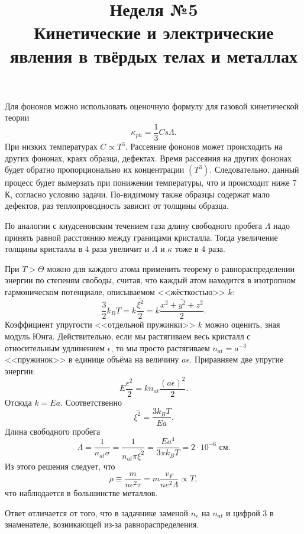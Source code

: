 \documentclass[a4paper]{article}
\title{Неделя №5\\
Кинетические и электрические явления
в твёрдых телах и металлах}
\begin{document}
	\maketitle
\begin{hiProb}[2.65]
\end{hiProb}
\begin{sol}
Для фононов можно использовать оценочную формулу
для газовой кинетической теории 
\[
\kappa_{ph}= \frac{1}{3} C s\Lambda
.\] 
При низких температурах $C \propto T^3$.
Рассеяние фононов может происходить на других
фононах, краях образца, дефектах. Время
рассеяния на других фононах будет обратно
пропорционально их концентрации $(T^3)$. Следовательно,
данный процесс будет вымерзать при понижении температуры, что и происходит ниже 7 К, согласно условию
задачи. По-видимому также образцы содержат мало
дефектов, раз теплопроводность зависит от толщины
образца.

По аналогии с кнудсеновским течением газа длину
свободного пробега  $\Lambda$ надо принять
равной расстоянию между границами кристалла. Тогда
увеличение толщины кристалла в 4 раза увеличит
и $ \Lambda$ и $\kappa$ тоже в 4 раза.
\end{sol}
\begin{hiProb}[3.77]
\end{hiProb}
\begin{sol}
При $T > \Theta$ можно для каждого атома
применить теорему о равнораспределении энергии
по степеням свободы, считая, что каждый атом находится
в изотропном гармоническом потенциале, описываемом
<<жёсткостью>> $k$:
\[
\frac{3}{2} k_B T= k \frac{\overline{\xi^2}}{2}=
k \frac{\overline{x^2 +y^2+z^2}}{2}
.\] 
Коэффициент упругости <<отдельной пружинки>>
$k$ можно оценить, зная модуль Юнга. Действительно,
если мы растягиваем весь кристалл с относительным
удлинением $\epsilon $, то мы  просто растягиваем
$n_{at}=a^{-3}$ <<пружинок>> в единице объёма
на величину $a\epsilon $. Приравняем две
упругие энергии:
\[
	E \frac{\epsilon ^2}{2}=k n_{at} \frac{(a\epsilon )^2}{2}
.\] 
Отсюда $k=Ea$. Соответственно 
\[
\overline{\xi^2}= \frac{3k_B T}{Ea}
.\] 
Длина свободного пробега
\[
\Lambda = \frac{1}{n_{at}\sigma}= \frac{1}{n_{at}\pi
\overline{\xi^2}}= \frac{Ea^4}{3\pi k_B T}= 2\cdot 
10^{-6} \text{ см}
.\] 
Из этого решения следует, что
 \[
\rho\equiv \frac{m}{ne^2 \tau}=m \frac{v_F}{ne^2 \Lambda} \propto T
,\]
что наблюдается в большинстве металлов.

Ответ отличается от того, что в задачнике заменой
$n_e$ на $n_{at}$ и цифрой 3 в знаменателе,
возникающей из-за равнораспределения.
\end{sol}
\end{document}
